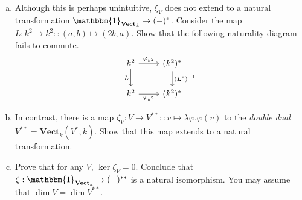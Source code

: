\documentclass{amsart}
\theoremstyle{remark}
\theoremstyle{definition}
\theoremstyle{definition}
\newcommand{\Id}[1]{\mathbbm{1}_{#1}}
\def\Vect{\mathbf{Vect}}
\begin{document}
\begin{enumerate}[(a)]
    \item Although this is perhaps unintuitive, $\xi_V$ does not extend to a natural transformation $\Id{\Vect_k}\to(-)^*$. Consider the map $L:k^2\to k^2::(a,b)\mapsto(2b,a)$. Show that the following naturality diagram fails to commute.
    \[
    \begin{tikzcd} 
    k^2 \arrow[r,"\varphi_{k^2}"] \arrow[d,"L"'] & (k^2)^* \arrow[d,"(L^*)^{-1}"]\\
    k^2 \arrow[r,"\varphi_{k^2}"'] & (k^2)^*
    \end{tikzcd}
    \]
    \item In contrast, there is a map $\zeta_V:V\to V^{**}::v\mapsto \lambda\varphi.\varphi(v)$ to the \emph{double dual} $V^{**}=\Vect_k(V^*,k)$. Show that this map extends to a natural transformation.
    
    \item Prove that for any $V$, $\ker\zeta_V=0$. Conclude that $\zeta:\Id{\Vect_k}\to(-)^{**}$ is a natural isomorphism. You may assume that $\dim V=\dim V^{**}$.
\end{enumerate}
\end{document}
